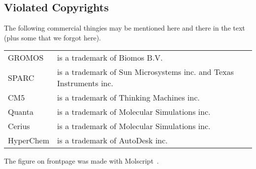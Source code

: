 \documentclass[11pt,dvips]{book}
\begin{document}
\subsection*{Violated Copyrights}
The following commercial thingies may be mentioned here and there in the
text (plus some that we forgot here).
\begin{table}[h]
\begin{tabularx}{\linewidth}{lX}
\hline
GROMOS    & is a trademark of Biomos B.V.\\
SPARC     & is a trademark of Sun Microsystems inc. and Texas Instruments inc.\\
CM5       & is a trademark of Thinking Machines inc.\\
Quanta    & is a trademark of Molecular Simulations inc.\\
Cerius    & is a trademark of Molecular Simulations inc.\\
HyperChem & is a trademark of AutoDesk inc.\\
\hline
\end{tabularx}
\end{table}

The figure on frontpage was made with Molscript~\cite{Kraulis91}.

%
%
\tableofcontents
\listoffigures
\listoftables

%
%
\newpage
\setcounter{page}{1}





%

%



%
%
\appendix





%
%



%
%
\printindex
\end{document}
